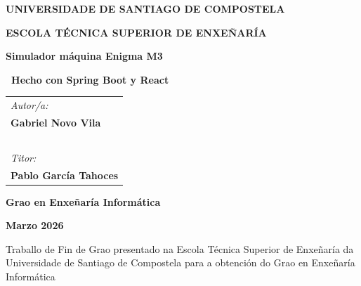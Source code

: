 \pagestyle{empty}
\begin{center}
	{\bf\Large UNIVERSIDADE DE SANTIAGO DE COMPOSTELA}
	
	\vspace{0.5cm}
	
	\vspace{0.5cm}
	{\bf\large ESCOLA TÉCNICA SUPERIOR DE ENXEÑARÍA}
	
	\vspace{3cm}
	{\bf\LARGE Simulador máquina Enigma M3}
	
	\vspace{0.5cm}
	{\bf\ Hecho con Spring Boot y React}
\end{center}

\vspace{2cm}
\hspace{4cm}\begin{tabular}{l}
	{\it\Large Autor/a:} \\
	{\bf\Large Gabriel Novo Vila} \\
	~ \\
	{\it\Large Titor:} \\
	{\bf\Large Pablo García Tahoces} \\
\end{tabular}

\vspace{2cm}
\begin{center}
	{\bf\Large Grao en Enxeñaría Informática}
	
	\vspace{0.5cm}
	{\bf\large Marzo 2026}
	
	\vspace{0.5cm}
	Traballo de Fin de Grao presentado na Escola Técnica Superior de Enxeñaría da Universidade de Santiago de Compostela para a obtención do Grao en Enxeñaría Informática
\end{center}

